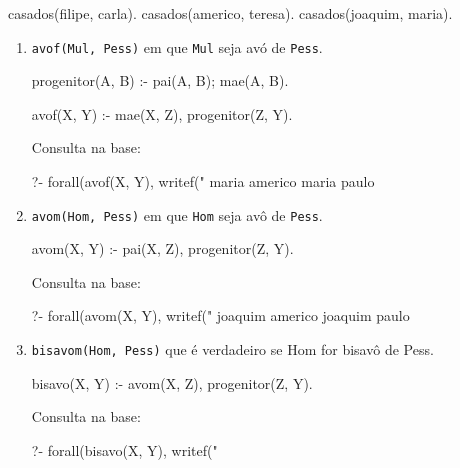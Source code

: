 \documentclass[10pt, twoside]{article}          %
\newenvironment{proof*}[1][proof*]              %
  {\proof[#1]\vspace{0.5em}\vspace*{-\baselineskip}
  \hspace{\parindent}\leftskip=.5cm\rightskip=.5cm}
  {\vspace*{-1.5\baselineskip}
  
  \rightskip=0cm\endproof}
\begin{document}
\begin{multicols*}{2}
\begin{enumerate}
\begin{pseudocode}[gobble=4]
    casados(filipe, carla).
    casados(americo, teresa).
    casados(joaquim, maria).
  \end{pseudocode} 
  \begin{proof*}[\unskip\nopunct]
    \begin{enumerate}
      \item \texttt{avof(Mul, Pess)} em que \texttt{Mul} seja avó de \texttt{Pess}.

        \begin{pseudocode}[gobble=10]
          progenitor(A, B) :-
              pai(A, B);
              mae(A, B).
      
          avof(X, Y) :-
              mae(X, Z),
              progenitor(Z, Y).
        \end{pseudocode}

        Consulta na base:
        \begin{pseudocode}[gobble=10]
          ?- forall(avof(X, Y), writef("%
          maria americo
          maria paulo
        \end{pseudocode}

      \item \texttt{avom(Hom, Pess)} em que \texttt{Hom} seja avô de \texttt{Pess}.

        \begin{pseudocode}[gobble=10]
          avom(X, Y) :-
              pai(X, Z),
              progenitor(Z, Y).
        \end{pseudocode}

        Consulta na base:
        \begin{pseudocode}[gobble=10]
          ?- forall(avom(X, Y), writef("%
          joaquim americo
          joaquim paulo
        \end{pseudocode}

      \item \texttt{bisavom(Hom, Pess)} que é verdadeiro se Hom for bisavô de Pess.

        \begin{pseudocode}[gobble=10]
          bisavo(X, Y) :-
              avom(X, Z),
              progenitor(Z, Y).
        \end{pseudocode}

        Consulta na base:
        \begin{pseudocode}[gobble=10]
          ?- forall(bisavo(X, Y), writef("%
        \end{pseudocode}


\end{enumerate}
\end{proof*}
\end{enumerate}
\end{multicols*}
\end{document}
